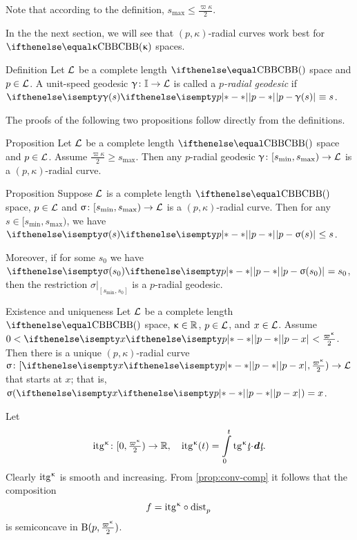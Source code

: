 Note that according to the definition, $s_{\max}\le\tfrac{\varpi\kappa}2$.

In the the next section, we will see that  $(p,\kappa)$-radial curves 
work best for $\Alex\kappa$ spaces.



\begin{thm}{Definition}\label{def:rad-geod}
Let $\mathcal{L}$ be a complete length $\Alex{}$ space
and $p\in\spc{L}$.
A unit-speed geodesic  $\gamma\:\II\to \spc{L}$  is called a
\emph{$p$-radial geodesic} if 
$\dist{p}{\gamma(s)}{}\equiv s$.
\end{thm}

The proofs of the following two propositions follow directly from the definitions. 

\begin{thm}{Proposition}\label{prop:rad-geod}
Let $\mathcal{L}$ be a complete length $\Alex{}$ space
and $p\in\spc{L}$.
Assume $\tfrac{\varpi\kappa}{2}
\ge 
s_{\max}$.
Then any $p$-radial geodesic 
$\gamma\:[s_{\min},s_{\max})
\to 
\spc{L}$ 
is a $(p,\kappa)$-radial curve.
\end{thm}

\begin{thm}{Proposition}\label{prop:dist<s}
Suppose $\mathcal{L}$ is a complete length $\Alex{}$ space, 
$p\in\spc{L}$ 
and $\sigma\:[s_{\min},s_{\max})\to \spc{L}$ is a $(p,\kappa)$-radial curve.
Then for any $s\in [s_{\min},s_{\max})$, 
we have $\dist{p}{\sigma(s)}{}\le s$.

Moreover, 
if for some $s_0$ we have $\dist{p}{\sigma(s_0)}{}= s_0$, 
then the restriction $\sigma|_{[s_{\min},s_0]}$ is a $p$-radial geodesic.
\end{thm}

\begin{thm}{Existence and uniqueness}\label{rad-curv-exist}
Let $\mathcal{L}$ be a complete length $\Alex{}$ space, 
$\kappa\in\RR$, 
$p\in\spc{L}$, 
and $x\in \spc{L}$.
Assume
$0
<
\dist{p}{x}{}
<
\tfrac{\varpi\kappa}2$.
Then there is a unique $(p,\kappa)$-radial curve $\sigma\:[\dist{p}{x}{},\tfrac{\varpi\kappa}2)\to \spc{L}$ 
that starts at $x$;
that is, $\sigma(\dist{p}{x}{})=x$.
\end{thm}


Let \index{$\itg\kappa$} 
\[\itg\kappa\:[0,\tfrac{\varpi\kappa}2)\to\RR,
\quad 
\itg\kappa (t)=\int\limits_0^t\tang\kappa\under t\cdot\dd\under t.\]
Clearly $\itg\kappa$ is smooth and increasing.
From \ref{prop:conv-comp} it follows that the composition 
\[f=\itg\kappa\circ\distfun{p}{}{}\] 
is semiconcave in $\oBall(p,\tfrac{\varpi\kappa}2)$.

